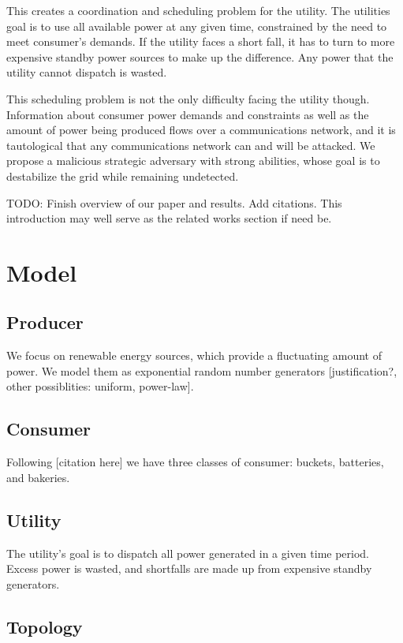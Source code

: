 \documentclass[conference]{IEEEtran}
\begin{document}
This creates a coordination and scheduling problem for the utility.  The utilities goal is to use all available power at any
given time, constrained by the need to meet consumer's demands.  If the utility faces a short fall, it has to turn to more 
expensive standby power sources to make up the difference.  Any power that the utility cannot dispatch is wasted.

This scheduling problem is not the only difficulty facing the utility though.  Information about consumer power demands and 
constraints as well as the amount of power being produced flows over a communications network, and it is tautological that 
any communications network can and will be attacked.  We propose a malicious strategic adversary with strong abilities, whose
goal is to destabilize the grid while remaining undetected. 

TODO: Finish overview of our paper and results.  Add citations.  This introduction may well serve as the related works 
section if need be.

\section{Model}

\subsection{Producer}

We focus on renewable energy sources, which provide a fluctuating amount of power.  We model them as exponential random 
number generators [justification?, other possiblities: uniform, power-law].

\subsection{Consumer}

Following [citation here] we have three classes of consumer: buckets, batteries, and bakeries.  

\subsection{Utility}

The utility's goal is to dispatch all power generated in a given time period.  Excess power is wasted, and shortfalls are 
made up from expensive standby generators.  

\subsection{Topology}
\end{document}
